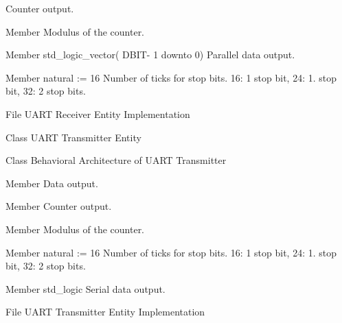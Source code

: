 \begin{DoxyRefList}
%
 Counter output.  
\item[Member \doxylink{classuart__rx_1_1behavioral_a91db294fcb9fcb66fc8d9ca0f821c4a6}{uart\+\_\+rx.behavioral.sync\+\_\+par\+\_\+counter} ]\label{brief__brief000072}%
%
 Modulus of the counter.  
\item[Member \doxylink{classuart__rx_a2bc0176254244b80e2399ad17f1f956d}{uart\+\_\+rx.dout} std\+\_\+logic\+\_\+vector( DBIT-\/ 1 downto 0) ]\label{brief__brief000070}%
%
 Parallel data output.  
\item[Member \doxylink{classuart__rx_ae74a9b328cac9ecf06f54be731e2023c}{uart\+\_\+rx.SB\+\_\+\+TICK} natural \+:= 16]\label{brief__brief000069}%
%
 Number of ticks for stop bits. 16\+: 1 stop bit, 24\+: 1. stop bit, 32\+: 2 stop bits.  
\item[File \doxylink{uart__rx_8vhdl}{uart\+\_\+rx.vhdl} ]\label{brief__brief000067}%
%
 UART Receiver Entity Implementation 
\item[Class \doxylink{classuart__tx}{uart\+\_\+tx} ]\label{brief__brief000076}%
%
 UART Transmitter Entity 
\item[Class \doxylink{classuart__tx_1_1behavioral}{uart\+\_\+tx.behavioral} ]\label{brief__brief000079}%
%
 Behavioral Architecture of UART Transmitter 
\item[Member \doxylink{classuart__tx_1_1behavioral_a6a880a0d780cd5e4e54fb5d6081f2e21}{uart\+\_\+tx.behavioral.n\+\_\+counter\+\_\+max} ]\label{brief__brief000082}%
%
 Data output.  
\item[Member \doxylink{classuart__tx_1_1behavioral_abb1f4b1077fed42215491ace6164cf2c}{uart\+\_\+tx.behavioral.register\+\_\+d} ]\label{brief__brief000081}%
%
 Counter output.  
\item[Member \doxylink{classuart__tx_1_1behavioral_a91db294fcb9fcb66fc8d9ca0f821c4a6}{uart\+\_\+tx.behavioral.sync\+\_\+par\+\_\+counter} ]\label{brief__brief000080}%
%
 Modulus of the counter.  
\item[Member \doxylink{classuart__tx_ae74a9b328cac9ecf06f54be731e2023c}{uart\+\_\+tx.SB\+\_\+\+TICK} natural \+:= 16]\label{brief__brief000077}%
%
 Number of ticks for stop bits. 16\+: 1 stop bit, 24\+: 1. stop bit, 32\+: 2 stop bits.  
\item[Member \doxylink{classuart__tx_a98dd33b35444db986d99130a0fecc550}{uart\+\_\+tx.tx} std\+\_\+logic ]\label{brief__brief000078}%
%
 Serial data output.  
\item[File \doxylink{uart__tx_8vhdl}{uart\+\_\+tx.vhdl} ]\label{brief__brief000075}%
%
 UART Transmitter Entity Implementation
\end{DoxyRefList}